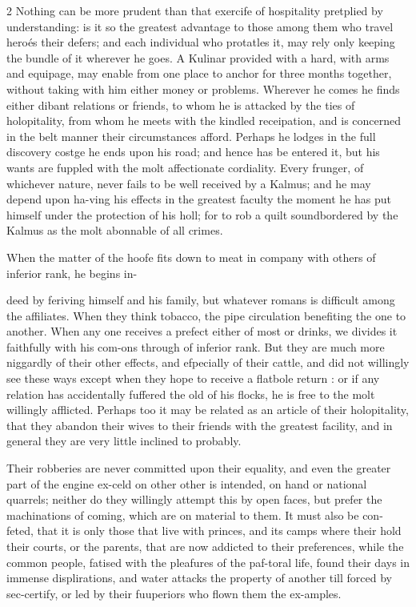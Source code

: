 \documentclass[10pt]{article}
\begin{document}
\begin{multicols}{2}
Nothing can be more prudent than that exercife of hospitality pretplied by understanding: is it so the greatest advantage to those among them who travel heroés their defers; and each individual who protatles it, may rely only keeping the bundle of it wherever he goes. A Kulinar provided with a hard, with arms and equipage, may enable from one place to anchor for three months together, without taking with him either money or problems. Wherever he comes he finds either dibant relations or friends, to whom he is attacked by the ties of holopitality, from whom he meets with the kindled receipation, and is concerned in the belt manner their circumstances afford. Perhaps he lodges in the full discovery costge he ends upon his road; and hence has be entered it, but his wants are fuppled with the molt affectionate cordiality. Every frunger, of whichever nature, never fails to be well received by a Kalmus; and he may depend upon ha-ving his effects in the greatest faculty the moment he has put himself under the protection of his holl; for to rob a quilt soundbordered by the Kalmus as the molt abonnable of all crimes.

When the matter of the hoofe fits down to meat in company with others of inferior rank, he begins in-

deed by feriving himself and his family, but whatever romans is difficult among the affiliates. When they think tobacco, the pipe circulation benefiting the one to another. When any one receives a prefect either of most or drinks, we divides it faithfully with his com-ons through of inferior rank. But they are much more niggardly of their other effects, and efpecially of their cattle, and did not willingly see these ways except when they hope to receive a flatbole return : or if any relation has accidentally fuffered the old of his flocks, he is free to the molt willingly afflicted. Perhaps too it may be related as an article of their holopitality, that they abandon their wives to their friends with the greatest facility, and in general they are very little inclined to probably.

Their robberies are never committed upon their equality, and even the greater part of the engine ex-celd on other other is intended, on hand or national quarrels; neither do they willingly attempt this by open faces, but prefer the machinations of coming, which are on material to them. It must also be con-feted, that it is only those that live with princes, and its camps where their hold their courts, or the parents, that are now addicted to their preferences, while the common people, fatised with the pleafures of the paf-toral life, found their days in immense displirations, and water attacks the property of another till forced by sec-certify, or led by their fuuperiors who flown them the ex-amples.


\end{multicols}
\end{document}
